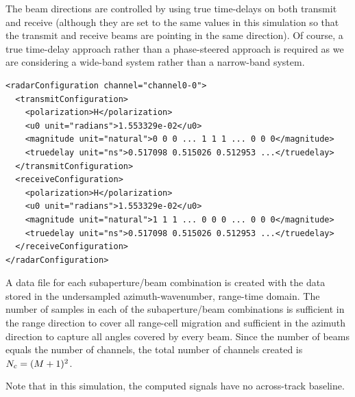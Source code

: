 \par
The beam directions are controlled by using true time-delays on both transmit and receive (although they are set to the same values in this simulation so that the transmit and receive beams are pointing in the same direction). Of course, a true time-delay approach rather than a phase-steered approach is required as we are considering a wide-band system rather than a narrow-band system.
\begin{lstlisting}[caption={Channel/Beam configuration}, label={lst:configuration}]
<radarConfiguration channel="channel0-0">
  <transmitConfiguration>
    <polarization>H</polarization>
    <u0 unit="radians">1.553329e-02</u0>
    <magnitude unit="natural">0 0 0 ... 1 1 1 ... 0 0 0</magnitude>
    <truedelay unit="ns">0.517098 0.515026 0.512953 ...</truedelay>
  </transmitConfiguration>
  <receiveConfiguration>
    <polarization>H</polarization>
    <u0 unit="radians">1.553329e-02</u0>
    <magnitude unit="natural">1 1 1 ... 0 0 0 ... 0 0 0</magnitude>
    <truedelay unit="ns">0.517098 0.515026 0.512953 ...</truedelay>
  </receiveConfiguration>
</radarConfiguration>
\end{lstlisting}
A data file for each subaperture/beam combination is created with the data stored in the undersampled azimuth-wavenumber, range-time domain. The number of samples in each of the subaperture/beam combinations is sufficient in the range direction to cover all range-cell migration and sufficient in the azimuth direction to capture all angles covered by every beam. Since the number of beams equals the number of channels, the total number of channels created is $N_c = (M+1)^2$.
\par
Note that in this simulation, the computed signals have no across-track baseline.
